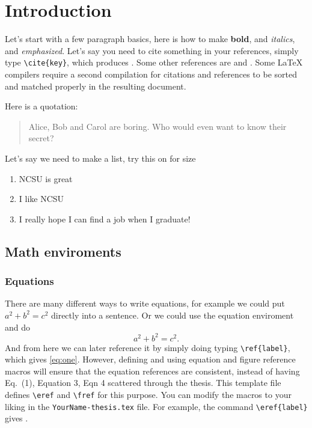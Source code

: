 \chapter{Introduction}
\label{chap-one}
Let's start with a few paragraph basics, here is how to make \textbf{bold}, 
and \textit{italics}, and \emph{emphasized}.  Let's say you need to cite 
something in your references, simply type \verb^\cite{key}^, which produces
\cite{einstein1935particle}.  
Some other references are \cite{golub1996matrix} and 
\cite{larsen1974asymptotic}.
Some \LaTeX{} compilers 
require a second compilation for citations and references 
to be sorted and matched properly in the resulting document.  

Here is a quotation:
\begin{quotation}
Alice, Bob and Carol are boring.  Who would even want to know their secret?
\end{quotation}

Let's say we need to make a list, try this on for size
\begin{enumerate}
  \item NCSU is great
  \item I like NCSU
  \item I really hope I can find a job when I graduate!
\end{enumerate} 

\section{Math enviroments}
\subsection{Equations}

There are many different ways to write equations, for example we could put 
$a^2 + b^2 = c^2$ directly into a sentence.  Or we could use the equation 
enviroment and do 
%
\begin{equation}
  a^2+b^2=c^2.
  \label{eq:one}
\end{equation} 
And from here we can later reference it by simply doing typing 
\verb^\ref{label}^, which gives \ref{eq:one}.  However, defining and using
equation and figure reference macros will ensure that the equation
references are consistent, instead of having Eq.~(1), Equation 3, Eqn 4
scattered through the thesis.  This template file defines \verb^\eref^
and \verb^\fref^ for this purpose. You can modify the macros to your liking
in the \texttt{YourName-thesis.tex} file.
For example, the command \verb^\eref{label}^ gives .


